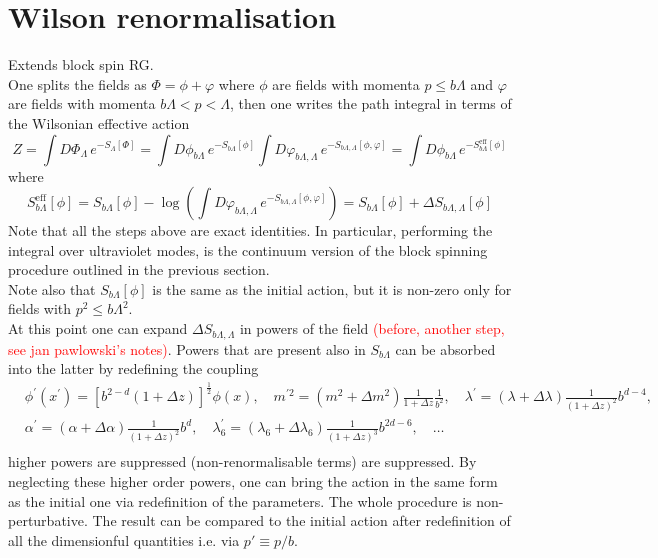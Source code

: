 \section{Wilson renormalisation}
\label{sec:wilson_rg}
Extends block spin RG. \\
One splits the fields as $\Phi = \phi + \varphi$ where $\phi$ are fields with momenta $p \leq b\Lambda$ and $\varphi$ are fields with momenta $b\Lambda < p < \Lambda$, then one writes the path integral in terms of the Wilsonian effective action
\begin{equation*}
    Z = \int D\Phi_\Lambda \, e^{-S_\Lambda[\Phi]} = \int D\phi_{b\Lambda} \, e^{-S_{b\Lambda}[\phi]} \int D\varphi_{b\Lambda, \Lambda}  \, e^{-S_{b\Lambda, \Lambda}[\phi, \varphi]} = \int D\phi_{b\Lambda} \, e^{-S_{b\Lambda}^\text{eff}[\phi]}
\end{equation*}
where 
\begin{equation*}
    S_{b\Lambda}^\text{eff}[\phi] = S_{b\Lambda}[\phi] - \log\left( \int D\varphi_{b\Lambda, \Lambda}  \, e^{-S_{b\Lambda, \Lambda}[\phi, \varphi]}\right) =  S_{b\Lambda}[\phi] + \Delta S_{b\Lambda, \Lambda}[\phi]
\end{equation*}
Note that all the steps above are exact identities. In particular, performing the integral over ultraviolet modes, is the continuum version of the block spinning procedure outlined in the previous section. \\
Note also that $S_{b\Lambda}[\phi]$ is the same as the initial action, but it is non-zero only for fields with $p^2 \leq b\Lambda^2$. \\
At this point one can expand $\Delta S_{b\Lambda, \Lambda}$ in powers of the field \textcolor{red}{(before, another step, see jan pawlowski's notes)}. Powers that are present also in $S_{b\Lambda}$ can be absorbed into the latter by redefining the coupling
\begin{equation}
\begin{aligned}
& \phi^{\prime}\left(x^{\prime}\right)=\left[b^{2-d}(1+\Delta z)\right]^{\frac{1}{2}} \phi(x), \quad m^{\prime 2}=\left(m^2+\Delta m^2\right) \frac{1}{1+\Delta z} \frac{1}{b^2}, \quad \lambda^{\prime}=(\lambda+\Delta \lambda) \frac{1}{(1+\Delta z)^2} b^{d-4}, \\
& \alpha^{\prime}=(\alpha+\Delta \alpha) \frac{1}{(1+\Delta z)^2} b^d, \quad \lambda_6^{\prime}=\left(\lambda_6+\Delta \lambda_6\right) \frac{1}{(1+\Delta z)^3} b^{2 d-6}, \quad \ldots \\
&
\end{aligned}
\end{equation}
higher powers are suppressed (non-renormalisable terms) are suppressed. By neglecting these higher order powers, one can bring the action in the same form as the initial one via redefinition of the parameters. The whole procedure is non-perturbative. The result can be compared to the initial action after redefinition of all the dimensionful quantities i.e. via $p'\equiv p/b$. 

